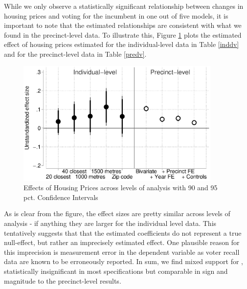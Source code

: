 \documentclass[12pt,a4paper]{article}
\begin{document}
	While we only observe a statistically significant relationship between changes in housing prices and voting for the incumbent in one out of five models, it is important to note that the estimated relationships are consistent with what we found in the precinct-level data. To illustrate this, Figure \ref{comparison} plots the estimated effect of housing prices estimated for the individual-level data in Table \ref{inddv}  and for the precinct-level data in Table \ref{predv}.
	
	\begin{figure}[htbp!]
		\includegraphics[width=0.9\textwidth]{../figures/comparison.eps}
		\centering
		\caption{Effects of Housing Prices across levels of analysis with 90  and 95 pct. Confidence Intervals}\label{comparison}
	\end{figure}
	
	As is clear from the figure, the effect sizes are pretty similar across levels of analysis - if anything they are larger for the individual level data. This tentatively suggests that that the estimated coefficients do not represent a true null-effect, but rather an imprecisely estimated effect. One plausible reason for this imprecision is measurement error in the dependent variable as voter recall data are known to be erroneously reported. In sum, we find mixed support for \hone, statistically insignificant in most specifications but comparable in sign and magnitude to the precinct-level results.
	
	
	
\end{document}
